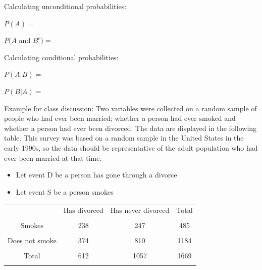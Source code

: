\documentclass[
]{report}
\begin{document}

Calculating unconditional probabilities:

\(P(A)=\)

\vspace{0.2in}

\(P(A\) and \(B^c) =\)

\vspace{0.2in}

Calculating conditional probabilities:

\(P(A|B)=\)

\vspace{0.2in}

\(P(B|A) =\)

\vspace{0.2in}


Example for class discussion: Two variables were collected on a random sample of people who had ever been married; whether a person had ever smoked and whether a person had ever been divorced. The data are displayed in the following table. This survey was based on a random sample in the United States in the early 1990s, so the data should be representative of the adult population who had ever been married at that time.

\begin{itemize}
\item
  Let event D be a person has gone through a divorce
\item
  Let event S be a person smokes
\end{itemize}

\begin{center}
\begin{tabular}{|c|c|c|c|} \hline
\hspace{0.8in} & \hspace{0.35in} Has divorced \hspace{.35in} & \hspace{0.35in} Has never divorced  \hspace{0.35in} & \hspace{0.3in} Total \hspace{0.3in} \\ 
& & & \\ \hline
Smokes & 238 & 247 & 485 \\ 
& & & \\ \hline
Does not smoke & 374 & 810 & 1184 \\ 
& & & \\ \hline
Total & 612 & 1057 & 1669 \\ 
& & & \\ \hline
\end{tabular}
\end{center}
\vspace{.1in}
\end{document}
